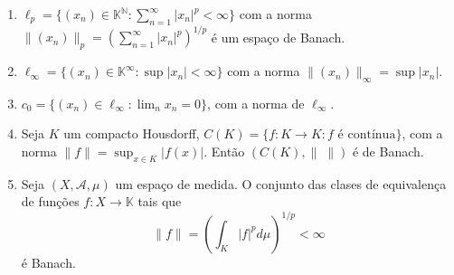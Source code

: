 \documentclass[portuguese]{article}
\theoremstyle{definition}
\newcommand{\N}{\mathbb{N}}
\begin{document}
	\begin{exemplo}\leavevmode
		\begin{enumerate}
			\item $\ell_p=\{(x_n)\in\mathbb{K}^\N:\sum_{n=1}^\infty|x_n|^p<\infty\}$ com a norma $\|(x_n)\|_p=\left(\sum_{n=1}^\infty|x_n|^p\right)^{1/p}$ é um espaço de Banach.
			\item $\ell_\infty=\{(x_n)\in\mathbb{K}^\infty:\sup|x_n|<\infty\}$ com a norma $\|(x_n)\|_\infty=\sup|x_n|$.
			\item $c_0=\{(x_n)\in\ell_\infty:\lim_{n}x_n=0\}$, com a norma de $\ell_\infty$.
			\item Seja $K$ um compacto Housdorff, $C(K)=\{f:K\to K:f\text{ é contínua}\}$, com a norma $\| f\|=\sup_{x\in K}|f(x)|$. Então $(C(K),\|\;\|)$ é de Banach.
			\item Seja $(X,\mathcal{A},\mu)$ um espaço de medida. O conjunto das clases de equivalença de funções $f:X\to \mathbb{K}$ tais que
			\[\| f\|=\left(\int_K|f|^pd\mu\right)^{1/p}<\infty\]
			é Banach.
		\end{enumerate}
	\end{exemplo}
\end{document}
